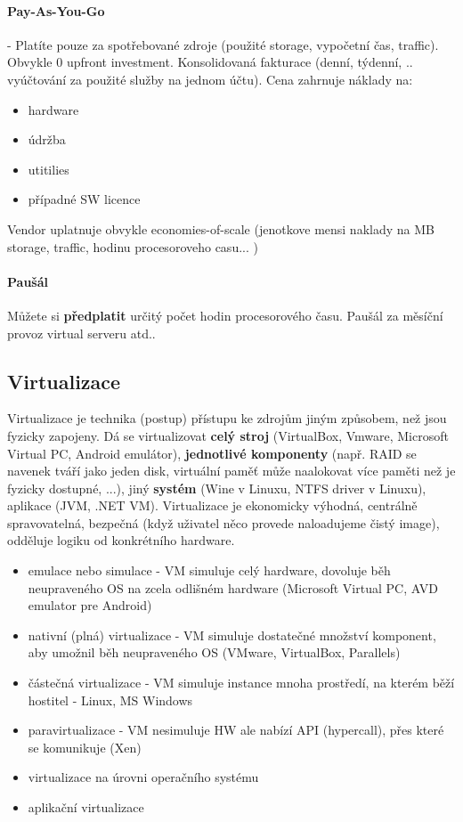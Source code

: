 \paragraph{Pay-As-You-Go} - Platíte pouze za spotřebované zdroje (použité storage, vypočetní čas, traffic). Obvykle 0 upfront investment. Konsolidovaná fakturace (denní, týdenní, .. vyúčtování za použité služby na jednom účtu). Cena zahrnuje náklady na:
\begin{itemize}[itemsep=0px]
\item hardware
\item údržba
\item utitilies
\item případné SW licence
\end{itemize}
Vendor uplatnuje obvykle economies-of-scale (jenotkove mensi naklady na MB storage, traffic, hodinu procesoroveho casu... )

\paragraph{Paušál} Můžete si \textbf{předplatit} určitý počet hodin procesorového času. Paušál za měsíční provoz virtual serveru atd..

\subsection{Virtualizace}
Virtualizace je technika (postup) přístupu ke zdrojům jiným způsobem, než jsou fyzicky zapojeny. Dá se virtualizovat \textbf{celý stroj} (VirtualBox, Vmware, Microsoft Virtual PC, Android emulátor), \textbf{jednotlivé komponenty} (např. RAID se navenek tváří jako jeden disk, virtuální paměť může naalokovat více paměti než je fyzicky dostupné, ...), jiný \textbf{systém} (Wine v Linuxu, NTFS driver v Linuxu), aplikace (JVM, .NET VM). Virtualizace je ekonomicky výhodná, centrálně spravovatelná, bezpečná (když uživatel něco provede naloadujeme čistý image), odděluje logiku od konkrétního hardware.

\begin{itemize}[itemsep=0px]
\item emulace nebo simulace - VM simuluje celý hardware, dovoluje běh neupraveného OS na zcela odlišném hardware (Microsoft Virtual PC, AVD emulator pre Android)
\item nativní (plná) virtualizace - VM simuluje dostatečné množství komponent, aby umožnil běh neupraveného OS (VMware, VirtualBox, Parallels)
\item částečná virtualizace - VM simuluje instance mnoha prostředí, na kterém běží hostitel - Linux, MS Windows
\item paravirtualizace - VM nesimuluje HW ale nabízí API (hypercall), přes které se komunikuje (Xen)
\item virtualizace na úrovni operačního systému
\item aplikační virtualizace
\end{itemize}

